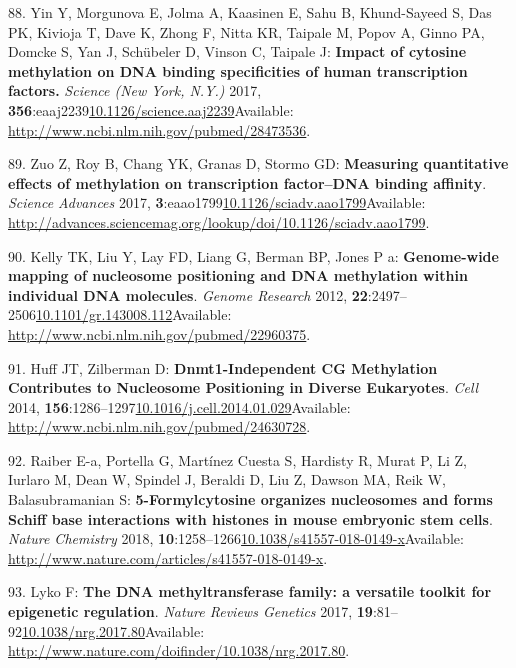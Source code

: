 \documentclass[
]{book}
\begin{document}
\leavevmode\hypertarget{ref-Yin2017}{}%
88. Yin Y, Morgunova E, Jolma A, Kaasinen E, Sahu B, Khund-Sayeed S, Das PK, Kivioja T, Dave K, Zhong F, Nitta KR, Taipale M, Popov A, Ginno PA, Domcke S, Yan J, Schübeler D, Vinson C, Taipale J: \textbf{Impact of cytosine methylation on DNA binding specificities of human transcription factors.} \emph{Science (New York, N.Y.)} 2017, \textbf{356}:eaaj2239\href{https://doi.org/10.1126/science.aaj2239}{10.1126/science.aaj2239}Available: \url{http://www.ncbi.nlm.nih.gov/pubmed/28473536}.

\leavevmode\hypertarget{ref-Zuo2017}{}%
89. Zuo Z, Roy B, Chang YK, Granas D, Stormo GD: \textbf{Measuring quantitative effects of methylation on transcription factor--DNA binding affinity}. \emph{Science Advances} 2017, \textbf{3}:eaao1799\href{https://doi.org/10.1126/sciadv.aao1799}{10.1126/sciadv.aao1799}Available: \url{http://advances.sciencemag.org/lookup/doi/10.1126/sciadv.aao1799}.

\leavevmode\hypertarget{ref-Kelly2012}{}%
90. Kelly TK, Liu Y, Lay FD, Liang G, Berman BP, Jones P a: \textbf{Genome-wide mapping of nucleosome positioning and DNA methylation within individual DNA molecules}. \emph{Genome Research} 2012, \textbf{22}:2497--2506\href{https://doi.org/10.1101/gr.143008.112}{10.1101/gr.143008.112}Available: \url{http://www.ncbi.nlm.nih.gov/pubmed/22960375}.

\leavevmode\hypertarget{ref-Huff2014}{}%
91. Huff JT, Zilberman D: \textbf{Dnmt1-Independent CG Methylation Contributes to Nucleosome Positioning in Diverse Eukaryotes}. \emph{Cell} 2014, \textbf{156}:1286--1297\href{https://doi.org/10.1016/j.cell.2014.01.029}{10.1016/j.cell.2014.01.029}Available: \url{http://www.ncbi.nlm.nih.gov/pubmed/24630728}.

\leavevmode\hypertarget{ref-Raiber2017}{}%
92. Raiber E-a, Portella G, Martínez Cuesta S, Hardisty R, Murat P, Li Z, Iurlaro M, Dean W, Spindel J, Beraldi D, Liu Z, Dawson MA, Reik W, Balasubramanian S: \textbf{5-Formylcytosine organizes nucleosomes and forms Schiff base interactions with histones in mouse embryonic stem cells}. \emph{Nature Chemistry} 2018, \textbf{10}:1258--1266\href{https://doi.org/10.1038/s41557-018-0149-x}{10.1038/s41557-018-0149-x}Available: \url{http://www.nature.com/articles/s41557-018-0149-x}.

\leavevmode\hypertarget{ref-Lyko2017}{}%
93. Lyko F: \textbf{The DNA methyltransferase family: a versatile toolkit for epigenetic regulation}. \emph{Nature Reviews Genetics} 2017, \textbf{19}:81--92\href{https://doi.org/10.1038/nrg.2017.80}{10.1038/nrg.2017.80}Available: \url{http://www.nature.com/doifinder/10.1038/nrg.2017.80}.
\end{document}
